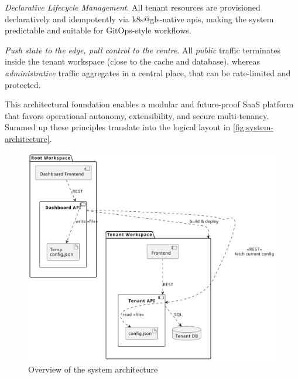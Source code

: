 \documentclass[11pt, a4paper, oneside, listof=totoc]{scrartcl}
\begin{document}
\begin{enumerate}[label={[\arabic*]:},
                    ref=Challenge~\arabic*,
                    leftmargin=*,
                    itemsep=0.6\baselineskip]
                    \item\label{chal:declarativeLifecycle}
                        \textit{Declarative Lifecycle Management}.
                        All tenant resources are provisioned declaratively and idempotently via
                        \gls{k8s@gls}-native \glspl{api}, making the system predictable and suitable
                        for GitOps-style workflows.

                    \item\label{chal:pushState}
                        \textit{Push state to the edge, pull control to the centre}.
                        All \textit{public} traffic terminates inside the tenant workspace
                        (close to the cache and database), whereas \textit{administrative} traffic
                        aggregates in a central place, that can be rate-limited and protected.

                \end{enumerate}

                This architectural foundation enables a modular and future-proof SaaS platform that
                favors operational autonomy, extensibility, and secure multi-tenancy.
                \\
                Summed up these principles translate into the logical layout in
                \autoref{fig:system-architecture}.
                \vspace{0.5cm}
                \begin{figure}[H]
                    \centering
                    \includegraphics[scale=0.75]{images/WorkspaceArchitecture.pdf}
                    \caption{Overview of the system architecture}\label{fig:system-architecture}
                \end{figure}
\end{document}

